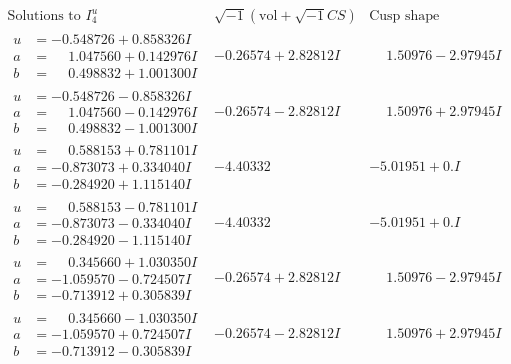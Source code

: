 \documentclass[1p]{elsarticle_modified}
\theoremstyle{definition}
\newcommand{\I}{\sqrt{-1}}
\begin{document}
$$\begin{array}{c|c|c}  
\text{Solutions to }I^u_{4}& \I (\text{vol} + \sqrt{-1}CS) & \text{Cusp shape}\\
 \hline 
\begin{aligned}
u &= -0.548726 + 0.858326 I \\
a &= \phantom{-}1.047560 + 0.142976 I \\
b &= \phantom{-}0.498832 + 1.001300 I\end{aligned}
 & -0.26574 + 2.82812 I & \phantom{-}1.50976 - 2.97945 I \\ \hline\begin{aligned}
u &= -0.548726 - 0.858326 I \\
a &= \phantom{-}1.047560 - 0.142976 I \\
b &= \phantom{-}0.498832 - 1.001300 I\end{aligned}
 & -0.26574 - 2.82812 I & \phantom{-}1.50976 + 2.97945 I \\ \hline\begin{aligned}
u &= \phantom{-}0.588153 + 0.781101 I \\
a &= -0.873073 + 0.334040 I \\
b &= -0.284920 + 1.115140 I\end{aligned}
 & -4.40332\phantom{ +0.000000I} & -5.01951 + 0. I\phantom{ +0.000000I} \\ \hline\begin{aligned}
u &= \phantom{-}0.588153 - 0.781101 I \\
a &= -0.873073 - 0.334040 I \\
b &= -0.284920 - 1.115140 I\end{aligned}
 & -4.40332\phantom{ +0.000000I} & -5.01951 + 0. I\phantom{ +0.000000I} \\ \hline\begin{aligned}
u &= \phantom{-}0.345660 + 1.030350 I \\
a &= -1.059570 - 0.724507 I \\
b &= -0.713912 + 0.305839 I\end{aligned}
 & -0.26574 + 2.82812 I & \phantom{-}1.50976 - 2.97945 I \\ \hline\begin{aligned}
u &= \phantom{-}0.345660 - 1.030350 I \\
a &= -1.059570 + 0.724507 I \\
b &= -0.713912 - 0.305839 I\end{aligned}
 & -0.26574 - 2.82812 I & \phantom{-}1.50976 + 2.97945 I \\ \hline\begin{aligned}

\end{aligned}
\end{array}$$
\end{document}
